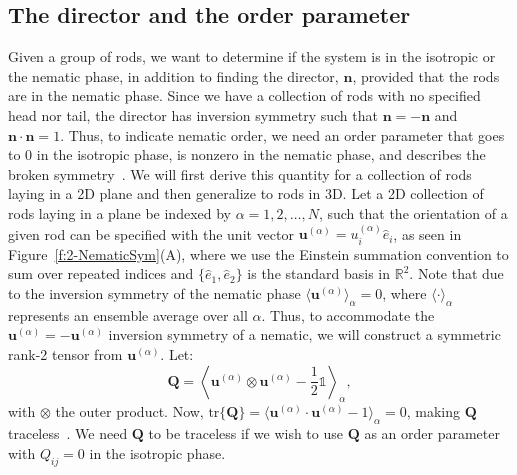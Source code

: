 \subsection{The director and the order parameter}
Given a group of rods, we want to determine if the system is in the isotropic or the nematic phase, in addition to finding the director, $\mathbf{n}$, provided that the rods are in the nematic phase.
Since we have a collection of rods with no specified head nor tail, the director has inversion symmetry such that $\mathbf{n} = -\mathbf{n}$ and $\mathbf{n}\cdot\mathbf{n} = 1$.
Thus, to indicate nematic order, we need an order parameter that goes to $0$ in the isotropic phase, is nonzero in the nematic phase, and describes the broken symmetry~\cite{RN33,RN175}.
We will first derive this quantity for a collection of rods laying in a 2D plane and then generalize to rods in 3D.
Let a 2D collection of rods laying in a plane be indexed by $\alpha = 1,2,\dots, N$, such that the orientation of a given rod can be specified with the unit vector $\mathbf{u}^{(\alpha)} = u^{(\alpha)}_i\hat{e}_i$, as seen in Figure~\ref{f:2-NematicSym}(A), where we use the Einstein summation convention to sum over repeated indices and $\{\hat{e}_1,\hat{e}_2  \}$ is the standard basis in $\mathbb{R}^2$.
Note that due to the inversion symmetry of the nematic phase $\langle \mathbf{u}^{(\alpha)}\rangle_{\alpha} = 0$, where $\langle \cdot \rangle_{\alpha}$ represents an ensemble average over all $\alpha$.
Thus, to accommodate the $\mathbf{u}^{(\alpha)} = -\mathbf{u}^{(\alpha)}$ inversion symmetry of a nematic, we will construct a symmetric rank-2 tensor from $\mathbf{u}^{(\alpha)}$.
Let:
\begin{equation}
  \mathbf{Q} = \left \langle \mathbf{u}^{(\alpha)} \otimes \mathbf{u}^{(\alpha)} - \frac{1}{2} \mathbb{1} \right \rangle_{\alpha},\label{e:2-2DOrderRaw}
\end{equation}
with $\otimes$ the outer product.
Now, $\textrm{tr}\big \{ \mathbf{Q} \big \} = \langle \mathbf{u}^{(\alpha)} \cdot \mathbf{u}^{(\alpha)} - 1 \rangle_{\alpha} = 0$, making $\mathbf{Q}$ traceless~\cite{RN33,RN175}.
We need $\mathbf{Q}$ to be traceless if we wish to use $\mathbf{Q}$ as an order parameter with $Q_{ij} = 0$ in the isotropic phase.

